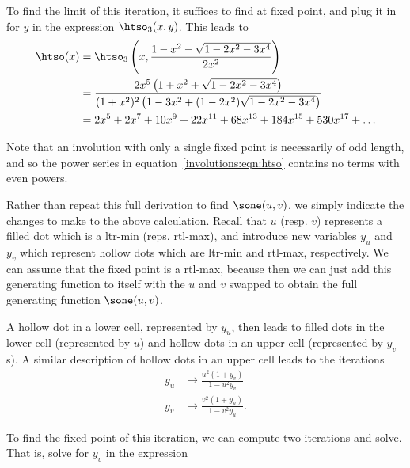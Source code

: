 \documentclass[12pt,twoside]{memoir}
\begin{document}
      To find the limit of this iteration, it suffices to find at fixed point,
      and plug it in for $y$ in the expression $\htso_3(x,y)$. 
      This leads to 
      \begin{equation} \label{involutions:eqn:htso}
        \begin{split}
        \htso(x) 
        &= \htso_3 \left(x, \frac{1 - x^2 - \sqrt{1-2x^2 - 3x^4}}{2x^2}\right) \\
        &= \frac{2x^5 \left(1 + x^2 + \sqrt{1 - 2x^2-3x^4}\right)}{%
            (1+x^2)^2 \left(1 - 3x^2 + (1-2x^2)\sqrt{1-2x^2-3x^4}\right)} \\
        &= 2x^5 + 2x^7 + 10x^9 + 22x^{11} + 68x^{13} + 184x^{15} + 530x^{17}
        +\dots \\
        \end{split}
      \end{equation}

      Note that an involution with only a single fixed point is necessarily of
      odd length, and so the power series in equation~\ref{involutions:eqn:htso}
      contains no terms with even powers. 


      Rather than repeat this full derivation to find $\sone(u,v)$, we simply
      indicate the changes to make to the above calculation.  Recall that $u$
      (resp. $v$) represents a filled dot which is a ltr-min (reps. rtl-max), and
      introduce new variables $y_u$ and $y_v$ which represent hollow dots which
      are ltr-min and rtl-max, respectively.  We can assume that the fixed point
      is a rtl-max, because then we can just add this generating function to
      itself with the $u$ and $v$ swapped to obtain the full generating function
      $\sone(u,v)$. 

      A hollow dot in a lower cell, represented by $y_u$, then leads to filled
      dots in the lower cell (represented by $u$) and hollow dots in an upper
      cell (represented by $y_v$s).  A similar description of hollow dots in an
      upper cell leads to the iterations
      \begin{equation}\label{involutions:eqn:dual-iterations}
        \begin{split}
        y_u &\mapsto \frac{u^2 (1 + y_v)}{1 - u^2 y_v} \\ 
        y_v &\mapsto \frac{v^2 (1 + y_u)}{1 - v^2 y_u}.
        \end{split}
      \end{equation}

      To find the fixed point of this iteration, we can compute two iterations
      and solve. That is, solve for $y_v$ in the expression 
\end{document}
